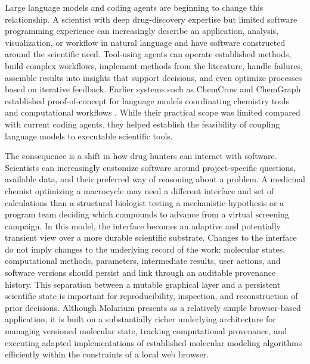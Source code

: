 \documentclass[11pt]{article}
\begin{document}
Large language models and coding agents are beginning to change this relationship. A scientist with deep drug-discovery expertise but limited software programming experience can increasingly describe an application, analysis, visualization, or workflow in natural language and have software constructed around the scientific need. Tool-using agents can operate established methods, build complex workflows, implement methods from the literature, handle failures, assemble results into insights that support decisions, and even optimize processes based on iterative feedback. Earlier systems such as ChemCrow and ChemGraph established proof-of-concept for language models coordinating chemistry tools and computational workflows \citep{bran2024chemcrow,boiko2023coscientist,pham2026chemgraph,macknight2025rethinking}. While their practical scope was limited compared with current coding agents, they helped establish the feasibility of coupling language models to executable scientific tools.

The consequence is a shift in how drug hunters can interact with software. Scientists can increasingly customize software around project-specific questions, available data, and their preferred way of reasoning about a problem. A medicinal chemist optimizing a macrocycle may need a different interface and set of calculations than a structural biologist testing a mechanistic hypothesis or a program team deciding which compounds to advance from a virtual screening campaign. In this model, the interface becomes an adaptive and potentially transient view over a more durable scientific substrate. Changes to the interface do not imply changes to the underlying record of the work: molecular states, computational methods, parameters, intermediate results, user actions, and software versions should persist and link through an auditable provenance history. This separation between a mutable graphical layer and a persistent scientific state is important for reproducibility, inspection, and reconstruction of prior decisions. Although Molarium presents as a relatively simple browser-based application, it is built on a substantially richer underlying architecture for managing versioned molecular state, tracking computational provenance, and executing adapted implementations of established molecular modeling algorithms efficiently within the constraints of a local web browser.
\end{document}
